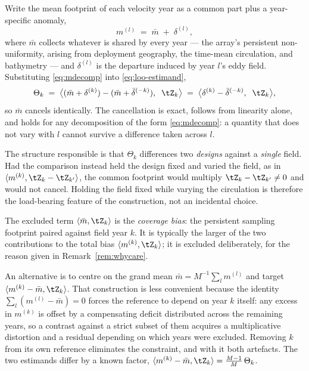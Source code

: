 \begin{remark}
\label{rem:coverage}
Write the mean footprint of each velocity year as a common part plus a year-specific anomaly,
\begin{equation}
  \label{eq:mdecomp}
  m^{(l)} \;=\; \bar{m} \;+\; \delta^{(l)},
\end{equation}
where $\bar{m}$ collects whatever is shared by every year --- the array's persistent
non-uniformity, arising from deployment geography, the time-mean circulation, and bathymetry ---
and $\delta^{(l)}$ is the departure induced by year $l$'s eddy field. Substituting
\eqref{eq:mdecomp} into \eqref{eq:loo-estimand},
\begin{equation}
  \Theta_k
  \;=\; \big\langle (\bar{m} + \delta^{(k)}) - (\bar{m} + \bar{\delta}^{(-k)}),\;\; \tZ_k\big\rangle
  \;=\; \big\langle \delta^{(k)} - \bar{\delta}^{(-k)},\;\; \tZ_k \big\rangle ,
\end{equation}
so $\bar{m}$ cancels identically. The cancellation is exact, follows from linearity alone, and
holds for any decomposition of the form \eqref{eq:mdecomp}: a quantity that does not vary with $l$
cannot survive a difference taken across $l$.

The structure responsible is that $\Theta_k$ differences two \emph{designs} against a
\emph{single} field. Had the comparison instead held the design fixed and varied the field, as in
$\langle m^{(k)}, \tZ_k - \tZ_{k'}\rangle$, the common footprint would multiply
$\tZ_k - \tZ_{k'} \neq 0$ and would not cancel. Holding the field fixed while varying the
circulation is therefore the load-bearing feature of the construction, not an incidental choice.

The excluded term $\langle \bar{m}, \tZ_k\rangle$ is the \emph{coverage bias}: the persistent
sampling footprint paired against field year $k$. It is typically the larger of the two
contributions to the total bias $\langle m^{(k)}, \tZ_k\rangle$; it is excluded deliberately, for
the reason given in Remark~\ref{rem:whycare}.
\end{remark}

\begin{remark}
\label{rem:whyloo}
An alternative is to centre on the grand mean $\bar{m} = M^{-1}\sum_{l} m^{(l)}$ and target
$\langle m^{(k)} - \bar{m}, \tZ_k\rangle$. That construction is less convenient because the
identity $\sum_{l}(m^{(l)} - \bar{m}) = 0$ forces the reference to depend on year $k$ itself: any
excess in $m^{(k)}$ is offset by a compensating deficit distributed across the remaining years, so
a contrast against a strict subset of them acquires a multiplicative distortion and a residual
depending on which years were excluded. Removing $k$ from its own reference eliminates the
constraint, and with it both artefacts. The two estimands differ by a known factor,
$\langle m^{(k)} - \bar m, \tZ_k\rangle = \tfrac{M-1}{M}\,\Theta_k$.
\end{remark}


